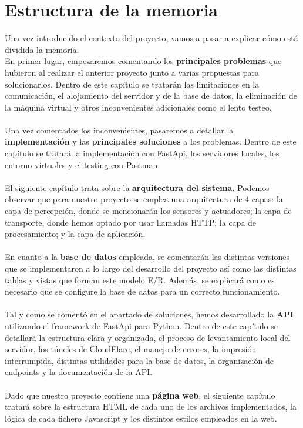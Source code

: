 \documentclass[12pt]{report}
\begin{document}
\section{Estructura de la memoria}
Una vez introducido el contexto del proyecto, vamos a pasar a explicar cómo está dividida la memoria.
\\
En primer lugar, empezaremos comentando los \textbf{principales problemas} que hubieron al realizar el anterior proyecto junto a varias propuestas para solucionarlos. Dentro de este capítulo se tratarán las limitaciones en la comunicación, el alojamiento del servidor y de la base de datos, la eliminación de la máquina virtual y otros inconvenientes adicionales como el lento testeo.
\\\\
Una vez comentados los inconvenientes, pasaremos a detallar la \textbf{implementación} y las \textbf{principales soluciones} a los problemas. Dentro de este capítulo se tratará la implementación con FastApi, los servidores locales, los entorno virtuales y el testing con Postman.
\\\\
El siguiente capítulo trata sobre la \textbf{arquitectura del sistema}. Podemos observar que para nuestro proyecto se emplea una arquitectura de 4 capas: la capa de percepción, donde se mencionarán los sensores y actuadores; la capa de transporte, donde hemos optado por usar llamadas HTTP; la capa de procesamiento; y la capa de aplicación.
\\\\
En cuanto a la \textbf{base de datos} empleada, se comentarán las distintas versiones que se implementaron a lo largo del desarrollo del proyecto así como las distintas tablas y vistas que forman este modelo E/R. Además, se explicará como es necesario que se configure la base de datos para un correcto funcionamiento.
\\\\
Tal y como se comentó en el apartado de soluciones, hemos desarrollado la \textbf{API} utilizando el framework de FastApi para Python. Dentro de este capítulo se detallará la estructura clara y organizada, el proceso de levantamiento local del servidor, los túneles de CloudFlare, el manejo de errores, la impresión interrumpida, distintas utilidades para la base de datos, la organización de endpoints y la documentación de la API.
\\\\
Dado que nuestro proyecto contiene una \textbf{página web}, el siguiente capítulo tratará sobre la estructura HTML de cada uno de los archivos implementados, la lógica de cada fichero Javascript y los distintos estilos empleados en la web.
\end{document}
